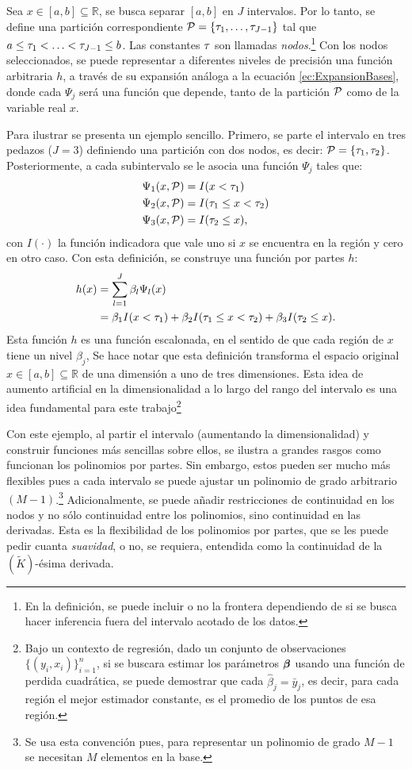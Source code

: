 \documentclass[../Main/Main.tex]{subfiles}
\begin{document}
Sea $x\in[a,b]\subseteq\mathbb{R}$, se busca separar $[a,b]$ en $J$ intervalos. Por lo tanto, se define una partición correspondiente $\P = \left\{\t_1, \ldots,  \t_{J-1} \right\}$ tal que $a \leq  \t_1 < \ldots <  \t_{J-1} \leq b$. Las constantes $\t$ son llamadas \textit{nodos}.\footnote{En la definición, se puede incluir o no la frontera dependiendo de si se busca hacer inferencia fuera del intervalo acotado de los datos.} Con los nodos seleccionados, se puede representar a diferentes niveles de precisión una función arbitraria $h$, a través de su expansión análoga a la ecuación \eqref{ec:ExpansionBases}, donde cada $\Psi_j$ será una función que depende, tanto de la partición $\P$ como de la variable real $x$. 

Para ilustrar se presenta un ejemplo sencillo. Primero, se parte el intervalo en tres pedazos ($J = 3$) definiendo una partición con dos nodos, es decir: $\P = \left\{\t_1,  \t_2\right\}$. Posteriormente, a cada subintervalo se le asocia una función $\Psi_j$ tales que:
\begin{align*}
	\Psi_1(x,\P) &= I( x <  \t_1) \\
	\Psi_2(x,\P) &= I( \t_1 \leq x <  \t_2) \\
	\Psi_3(x,\P) &= I( \t_2 \leq x ),
\end{align*}
con $I(\cdot)$ la función indicadora que vale uno si $x$ se encuentra en la región y cero en otro caso. Con esta definición, se construye una función por partes $h$: 
\begin{align*}
		h(x) &= \sum_{l = 1}^J \beta_l\Psi_l(x) \\
			 &= \beta_1 I( x <  \t_1) + \beta_2 I( \t_1 \leq x <  \t_2) + \beta_3 I( \t_2 \leq x).
\end{align*}
Esta función $h$ es una función escalonada, en el sentido de que cada región de $x$ tiene un nivel $\beta_j$, Se hace notar que esta definición transforma el espacio original $x\in[a,b]\subseteq\mathbb{R}$ de una dimensión a uno de tres dimensiones. Esta idea de aumento artificial en la dimensionalidad a lo largo del rango del intervalo es una idea fundamental para este trabajo\footnote{Bajo un contexto de regresión, dado un conjunto de observaciones $\{(y_i,x_i)\}_{i = 1}^n$, si se buscara estimar los parámetros $\betabf$ usando una función de perdida cuadrática, se puede demostrar que cada $\hat{\beta}_j = \bar{y}_j$, es decir, para cada región el mejor estimador constante, es el promedio de los puntos de esa región.}

Con este ejemplo, al partir el intervalo (aumentando la dimensionalidad) y construir funciones más sencillas sobre ellos, se ilustra a grandes rasgos como funcionan los polinomios por partes. Sin embargo, estos pueden ser mucho más flexibles pues a cada intervalo se puede ajustar un polinomio de grado arbitrario $(M-1)$.\footnote{Se usa esta convención pues, para representar un polinomio de grado $M-1$ se necesitan $M$ elementos en la base.} Adicionalmente, se puede añadir restricciones de continuidad en los nodos y no sólo continuidad entre los polinomios, sino continuidad en las derivadas. Esta es la flexibilidad de los polinomios por partes, que se les puede pedir cuanta \textit{suavidad}, o no, se requiera, entendida como la continuidad de la $(\tilde{K})$-ésima derivada. 
\end{document}
